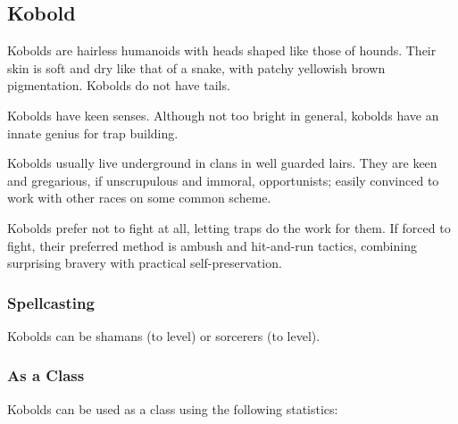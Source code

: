 \begin{multicols*}{2}
\subsection{Kobold}

Kobolds are hairless humanoids with heads shaped like those of hounds. Their skin is soft and dry like that of a snake, with patchy yellowish brown pigmentation. Kobolds do not have tails.

Kobolds have keen senses. Although not too bright in general, kobolds have an innate genius for trap building.

Kobolds usually live underground in clans in well guarded lairs. They are keen and gregarious, if unscrupulous and immoral, opportunists; easily convinced to work with other races on some common scheme.

Kobolds prefer not to fight at all, letting traps do the work for them. If forced to fight, their preferred method is ambush and hit-and-run tactics, combining surprising bravery with practical self-preservation.

\subsubsection{Spellcasting}
Kobolds can be shamans (to  level) or sorcerers (to  level).

\subsubsection{As a Class}
Kobolds can be used as a class using the following statistics:


\end{multicols*}
